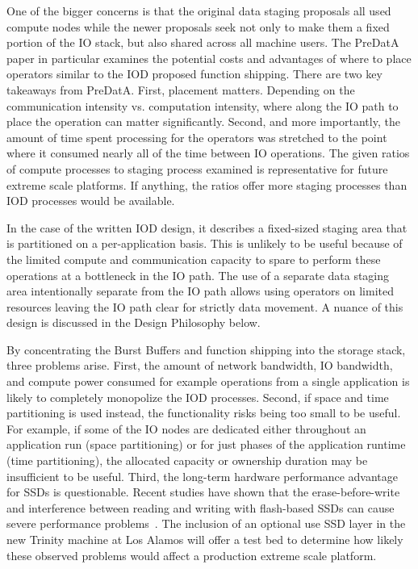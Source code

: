 \documentclass[conference]{IEEEtran}
\begin{document}
One of the bigger concerns is that the original data staging proposals all used
compute nodes while the newer proposals seek not only to make them a fixed
portion of the IO stack, but also shared across all machine users. The
PreDatA~\cite{zheng:2010:predata} paper in particular examines the potential
costs and advantages of where to place operators similar to the IOD proposed
function shipping. There are two key takeaways from PreDatA. First, placement
matters.  Depending on the communication intensity vs. computation intensity,
where along the IO path to place the operation can matter significantly.
Second, and more importantly, the amount of time spent processing for the
operators was stretched to the point where it consumed nearly all of the time
between IO operations. The given ratios of compute processes to staging process
examined is representative for future extreme scale platforms. If anything, the
ratios offer more staging processes than IOD processes would be available.

In the case of the written IOD design, it describes a fixed-sized staging area
that is partitioned on a per-application basis.  This is unlikely to be useful
because of the limited compute and communication capacity to spare to perform
these operations at a bottleneck in the IO path.  The use of a separate data
staging area intentionally separate from the IO path allows using operators on
limited resources leaving the IO path clear for strictly data movement. A
nuance of this design is discussed in the Design Philosophy below.

By concentrating the Burst Buffers and function shipping into the storage
stack, three problems arise.  First, the amount of network bandwidth, IO
bandwidth, and compute power consumed for example operations from a single
application is likely to completely monopolize the IOD processes. Second, if
space and time partitioning is used instead, the functionality risks being too
small to be useful. For example, if some of the IO nodes are dedicated either
throughout an application run (space partitioning) or for just phases of the
application runtime (time partitioning), the allocated capacity or ownership
duration may be insufficient to be useful. Third, the long-term hardware
performance advantage for SSDs is questionable. Recent studies have shown that
the erase-before-write and interference between reading and writing with
flash-based SSDs can cause severe performance
problems~\cite{skourtis:2013:ssd-performance}. The inclusion of an optional use
SSD layer in the new Trinity machine at Los Alamos will offer a test bed to
determine how likely these observed problems would affect a production extreme
scale platform.
\end{document}
